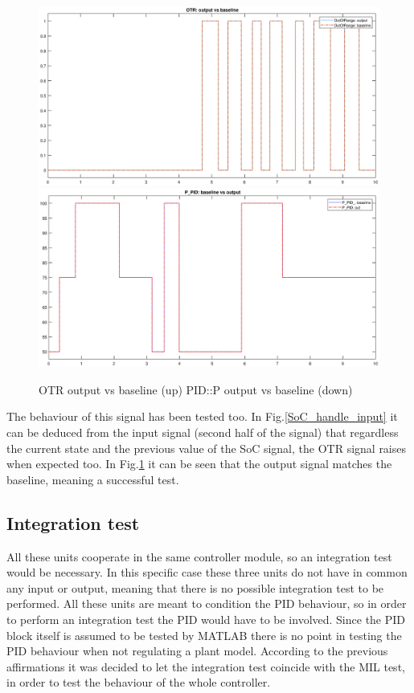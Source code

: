 \documentclass[12pt,a4paper]{report}
\begin{document}
\begin{figure}[!hbt]
	\centering
	\includegraphics[scale=0.4]{OTR_baseline_result.eps}\hfill
	\includegraphics[scale=0.4]{PidP_baseline_result.eps}
	\caption{OTR output vs baseline (up) PID::P output vs baseline (down)}
	\label{OTR_baseline_result}
\end{figure}
The behaviour of this signal has been tested too. In Fig.\ref{SoC_handle_input} it can be deduced from the input signal (second half of the signal) that regardless the current state and the previous value of the SoC signal, the OTR signal raises when expected too.
In Fig.\ref{OTR_baseline_result} it can be seen that the output signal matches the baseline, meaning a successful test.
\FloatBarrier
\subsection{Integration test}
All these units cooperate in the same controller module, so an integration test would be necessary. In this specific case these three units do not have in common any input or output, meaning that there is no possible integration test to be performed. All these units are meant to condition the PID behaviour, so in order to perform an integration test the PID would have to be involved. Since the PID block itself is assumed to be tested by MATLAB there is no point in testing the PID behaviour when not regulating a plant model.
According to the previous affirmations it was decided to let the integration test coincide with the MIL test, in order to test the behaviour of the whole controller.
\end{document}
